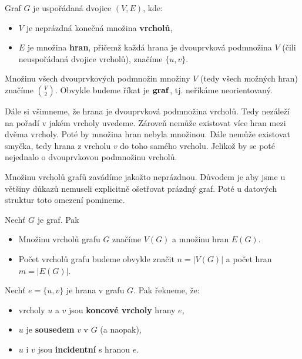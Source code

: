 \begin{definition}
Graf $G$ je uspořádaná dvojice $(V, E)$, kde:
\begin{itemize}
    \item $V$ je neprázdná konečná množina \textbf{vrcholů},
    \item $E$ je množina \textbf{hran}, přičemž každá hrana je dvouprvková podmnožina $V$ (čili neuspořádaná dvojice vrcholů), značíme $\{u, v\}$.
\end{itemize} \medskip
Množinu všech dvouprvkových podmnožin množiny $V$ (tedy všech možných hran) značíme $\binom{V}{2}$.
Obvykle budeme říkat je $\bold{graf}$, tj. neříkáme neorientovaný. \medskip
\end{definition}

\noindent Dále si všimneme, že hrana je dvouprvková podmnožina vrcholů. Tedy nezáleží na pořadí v jakém vrcholy uvedeme. Zároveň nemůže existovat více hran mezi dvěma vrcholy. Poté by množina hran nebyla množinou. Dále nemůže existovat smyčka, tedy hrana z vrcholu $v$ do toho samého vrcholu. Jelikož by se poté nejednalo o dvouprvkovou podmnožinu vrcholů. \bigskip

\begin{center}

\end{center}

\begin{remark}
Množinu vrcholů grafů zavádíme jakožto neprázdnou. Důvodem je aby jsme u většiny důkazů nemuseli explicitně ošetřovat prázdný graf. Poté u datových struktur toto omezení pomineme.
\end{remark}

\bigskip

\begin{definition}[značení]
Nechť $G$ je graf. Pak
\begin{itemize}
    \item Množinu vrcholů grafu $G$ značíme $V(G)$ a množinu hran $E(G)$.
    \item Počet vrcholů grafu budeme obvykle značit $n = |V(G)|$ a počet           hran $m = |E(G)|$.
\end{itemize}
\end{definition}

\bigskip

\begin{definition}[incidence]
Nechť $e = \{u, v\}$ je hrana v grafu $G$. Pak řekneme, že:
\begin{itemize}
    \item vrcholy $u$ a $v$ jsou \textbf{koncové vrcholy} hrany $e$,
    \item $u$ je \textbf{sousedem} $v$ v $G$ (a naopak),
    \item $u$ i $v$ jsou \textbf{incidentní} s hranou $e$.
\end{itemize}
\end{definition}

